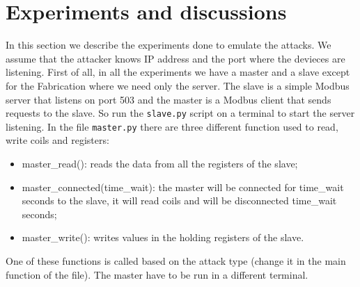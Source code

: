 \documentclass[12pt]{article}
\begin{document}
\section{Experiments and discussions}
In this section we describe the experiments done to emulate the attacks. We assume that the attacker knows IP address and the port where the devieces are listening. 
First of all, in all the experiments we have a master and a slave except for the Fabrication where we need only the server.
The slave is a simple Modbus server that listens on port 503 and the master is a Modbus 
client that sends requests to the slave. So run the \texttt{slave.py} script on a terminal to start 
the server listening. In the file 
\texttt{master.py} there are three different function used to read, write coils and registers:
\begin{itemize}
    \item master\_read(): reads the data from all the registers of the slave;
    \item master\_connected(time\_wait): the master will be connected for 
    time\_wait seconds to the slave, it will read coils and will be disconnected time\_wait seconds;
    \item master\_write(): writes values in the holding registers of the slave.
\end{itemize}
One of these functions is called based on the attack type (change it in the main function of the file).
The master have to be run in a different terminal.
\end{document}
